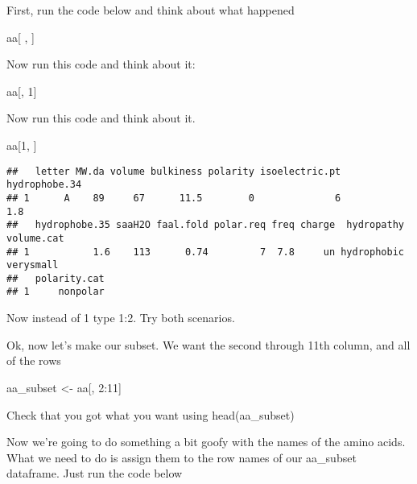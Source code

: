 \documentclass[
]{book}
\newenvironment{Shaded}{\begin{snugshade}}{\end{snugshade}}
\newcommand{\DecValTok}[1]{\textcolor[rgb]{0.00,0.00,0.81}{#1}}
\newcommand{\NormalTok}[1]{#1}
\newcommand{\OtherTok}[1]{\textcolor[rgb]{0.56,0.35,0.01}{#1}}
\newcommand{\SpecialCharTok}[1]{\textcolor[rgb]{0.00,0.00,0.00}{#1}}
\begin{document}
First, run the code below and think about what happened

\begin{Shaded}
\begin{Highlighting}[]
\NormalTok{aa[ , ]}
\end{Highlighting}
\end{Shaded}

Now run this code and think about it:

\begin{Shaded}
\begin{Highlighting}[]
\NormalTok{aa[, }\DecValTok{1}\NormalTok{]}
\end{Highlighting}
\end{Shaded}

Now run this code and think about it.

\begin{Shaded}
\begin{Highlighting}[]
\NormalTok{aa[}\DecValTok{1}\NormalTok{, ]}
\end{Highlighting}
\end{Shaded}

\begin{verbatim}
##   letter MW.da volume bulkiness polarity isoelectric.pt hydrophobe.34
## 1      A    89     67      11.5        0              6           1.8
##   hydrophobe.35 saaH2O faal.fold polar.req freq charge  hydropathy volume.cat
## 1           1.6    113      0.74         7  7.8     un hydrophobic  verysmall
##   polarity.cat
## 1     nonpolar
\end{verbatim}

Now instead of 1 type 1:2. Try both scenarios.

Ok, now let's make our subset. We want the second through 11th column, and all of the rows

\begin{Shaded}
\begin{Highlighting}[]
\NormalTok{aa\_subset }\OtherTok{\textless{}{-}}\NormalTok{ aa[, }\DecValTok{2}\SpecialCharTok{:}\DecValTok{11}\NormalTok{]}
\end{Highlighting}
\end{Shaded}

Check that you got what you want using head(aa\_subset)

Now we're going to do something a bit goofy with the names of the amino acids. What we need to do is assign them to the row names of our aa\_subset dataframe. Just run the code below
\end{document}
